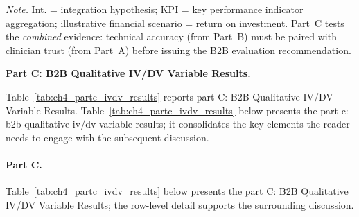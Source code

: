 \vspace{2pt}
\noindent\textit{Note.} Int. = integration hypothesis; KPI = key performance indicator aggregation; illustrative financial scenario = return on investment. Part~C tests the \textit{combined} evidence: technical accuracy (from Part~B) must be paired with clinician trust (from Part~A) before issuing the B2B evaluation recommendation.


\noindent\textbf{Part C: B2B Qualitative IV/DV Variable Results.}

\noindent Table~\ref{tab:ch4_partc_ivdv_results} reports part C: B2B Qualitative IV/DV Variable Results.
\noindent Table~\ref{tab:ch4_partc_ivdv_results} below presents the part c: b2b qualitative iv/dv variable results; it consolidates the key elements the reader needs to engage with the subsequent discussion.

\paragraph{Part C.}



\noindent Table~\ref{tab:ch4_partc_ivdv_results} below presents the part C: B2B Qualitative IV/DV Variable Results; the row-level detail supports the surrounding discussion.

